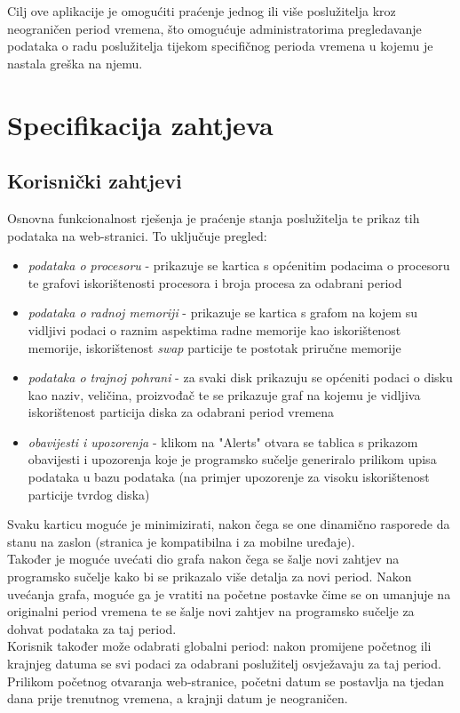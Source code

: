 \documentclass[zavrsnirad]{fer}
\begin{document}
Cilj ove aplikacije je omogućiti praćenje jednog ili više poslužitelja kroz neograničen period vremena, što omogućuje administratorima pregledavanje podataka o radu poslužitelja tijekom specifičnog perioda vremena u kojemu je nastala greška na njemu.


\chapter{Specifikacija zahtjeva}
\label{pog:specifikacija_zahtjeva}

\section{Korisnički zahtjevi}
Osnovna funkcionalnost rješenja je praćenje stanja poslužitelja te prikaz tih podataka na web-stranici.
To uključuje pregled:
\begin{itemize}
	\item \textit{podataka o procesoru} - prikazuje se kartica s općenitim podacima o procesoru te grafovi iskorištenosti procesora i broja procesa za odabrani period
	\item \textit{podataka o radnoj memoriji} - prikazuje se kartica s grafom na kojem su vidljivi podaci o raznim aspektima radne memorije kao iskorištenost memorije, iskorištenost \textit{swap} particije te postotak priručne memorije
	\item \textit{podataka o trajnoj pohrani} - za svaki disk prikazuju se općeniti podaci o disku kao naziv, veličina, proizvođač te se prikazuje graf na kojemu je vidljiva iskorištenost particija diska za odabrani period vremena
	\item \textit{obavijesti i upozorenja} - klikom na "Alerts" otvara se tablica s prikazom obavijesti i upozorenja koje je programsko sučelje generiralo prilikom upisa podataka u bazu podataka (na primjer upozorenje za visoku iskorištenost particije tvrdog diska)
\end{itemize}
Svaku karticu moguće je minimizirati, nakon čega se one dinamično rasporede da stanu na zaslon (stranica je kompatibilna i za mobilne uređaje).
\\Također je moguće uvećati dio grafa nakon čega se šalje novi zahtjev na programsko sučelje kako bi se prikazalo više detalja za novi period. Nakon uvećanja grafa, moguće ga je vratiti na početne postavke čime se on umanjuje na originalni period vremena te se šalje novi zahtjev na programsko sučelje za dohvat podataka za taj period.
\\Korisnik također može odabrati globalni period: nakon promijene početnog ili krajnjeg datuma se svi podaci za odabrani poslužitelj osvježavaju za taj period. Prilikom početnog otvaranja web-stranice, početni datum se postavlja na tjedan dana prije trenutnog vremena, a krajnji datum je neograničen.
\end{document}
